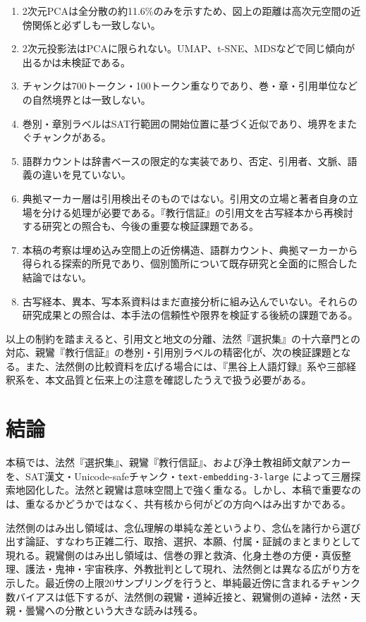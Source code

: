 \documentclass[uplatex,dvipdfmx,11pt,a4paper]{jsarticle}
\begin{document}
\begin{enumerate}
  \item 2次元PCAは全分散の約11.6\%のみを示すため、図上の距離は高次元空間の近傍関係と必ずしも一致しない。
  \item 2次元投影法はPCAに限られない。UMAP、t-SNE、MDSなどで同じ傾向が出るかは未検証である。
  \item チャンクは700トークン・100トークン重なりであり、巻・章・引用単位などの自然境界とは一致しない。
  \item 巻別・章別ラベルはSAT行範囲の開始位置に基づく近似であり、境界をまたぐチャンクがある。
  \item 語群カウントは辞書ベースの限定的な実装であり、否定、引用者、文脈、語義の違いを見ていない。
  \item 典拠マーカー層は引用検出そのものではない。引用文の立場と著者自身の立場を分ける処理が必要である。『教行信証』の引用文を古写経本から再検討する研究\cite{fujiwara2020}との照合も、今後の重要な検証課題である。
  \item 本稿の考察は埋め込み空間上の近傍構造、語群カウント、典拠マーカーから得られる探索的所見であり、個別箇所について既存研究と全面的に照合した結論ではない。
  \item 古写経本、異本、写本系資料はまだ直接分析に組み込んでいない。それらの研究成果との照合は、本手法の信頼性や限界を検証する後続の課題である。
\end{enumerate}

以上の制約を踏まえると、引用文と地文の分離、法然『選択集』の十六章門との対応、親鸞『教行信証』の巻別・引用別ラベルの精密化が、次の検証課題となる。また、法然側の比較資料を広げる場合には、『黒谷上人語灯録』系\cite{jodoshuzensho-gotoroku}や三部経釈系を、本文品質と伝来上の注意を確認したうえで扱う必要がある。

\section{結論}

本稿では、法然『選択集』、親鸞『教行信証』、および浄土教祖師文献アンカーを、SAT漢文・Unicode-safeチャンク・\texttt{text-embedding-3-large} によって三層探索地図化した。法然と親鸞は意味空間上で強く重なる。しかし、本稿で重要なのは、重なるかどうかではなく、共有核から何がどの方向へはみ出すかである。

法然側のはみ出し領域は、念仏理解の単純な差というより、念仏を諸行から選び出す論証、すなわち正雑二行、取捨、選択、本願、付属・証誠のまとまりとして現れる。親鸞側のはみ出し領域は、信巻の罪と救済、化身土巻の方便・真仮整理、護法・鬼神・宇宙秩序、外教批判として現れ、法然側とは異なる広がり方を示した。最近傍の上限20サンプリングを行うと、単純最近傍に含まれるチャンク数バイアスは低下するが、法然側の親鸞・道綽近接と、親鸞側の道綽・法然・天親・曇鸞への分散という大きな読みは残る。
\end{document}
